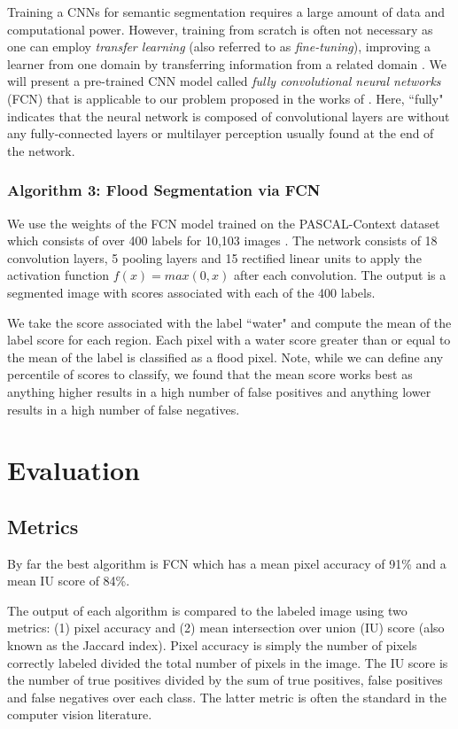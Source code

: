 \documentclass[review]{elsarticle}
\begin{document}
Training a CNNs for semantic segmentation requires a large amount of data and computational power. However, training from scratch is often not necessary as one can employ \emph{transfer learning} (also referred to as \emph{fine-tuning}), improving a learner from one domain by transferring information from a related domain \cite{weiss}. We will present a pre-trained CNN model called \emph{fully convolutional neural networks} (FCN) that is applicable to our problem proposed in the works of \cite{long}. Here, ``fully" indicates that the neural network is composed of convolutional layers are without any fully-connected layers or multilayer perception usually found at the end of the network.

\subsubsection{Algorithm 3: Flood Segmentation via FCN}

We use the weights of the FCN model trained on the PASCAL-Context dataset which consists of over 400 labels for 10,103 images \cite{mottaghi}. The network consists of 18 convolution layers, 5 pooling layers and 15 rectified linear units to apply the activation function $f(x) = max(0,x)$ after each convolution. The output is a segmented image with scores associated with each of the 400 labels.

We take the score associated with the label ``water" and compute the mean of the label score for each region. Each pixel with a water score greater than or equal to the mean of the label is classified as a flood pixel. Note, while we can define any percentile of scores to classify, we found that the mean score works best as anything higher results in a high number of false positives and anything lower results in a high number of false negatives.

\section{Evaluation}

\subsection{Metrics}By far the best algorithm is FCN which has a mean pixel accuracy of 91\% and a mean IU score of 84\%.

The output of each algorithm is compared to the labeled image using two metrics: (1) pixel accuracy and (2) mean intersection over union (IU) score (also known as the Jaccard index). Pixel accuracy is simply the number of pixels correctly labeled divided the total number of pixels in the image. The IU score is the number of true positives divided by the sum of true positives, false positives and false negatives over each class. The latter metric is often the standard in the computer vision literature.
\end{document}
